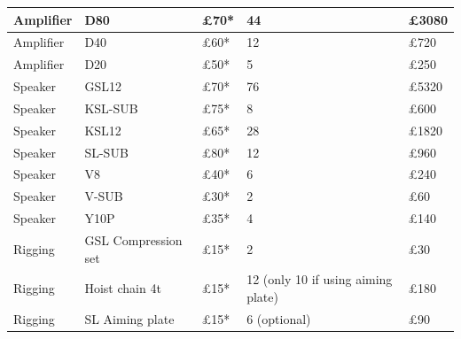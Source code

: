 \begin{longtable}[H]{|p{3cm}|p{4cm}|p{2cm}|p{3cm}|p{2cm}|}
Amplifier                          & D80                                & £70*                          & 44                                 & £3080  \\ \hline
Amplifier                          & D40                                & £60*                          & 12                                 & £720   \\ \hline
Amplifier                          & D20                                & £50*                          & 5                                  & £250   \\ \hline
\rowcolor[HTML]{EFEFEF} 
Speaker                            & GSL12                              & £70*                          & 76                                 & £5320  \\ \hline
\rowcolor[HTML]{EFEFEF} 
Speaker                            & KSL-SUB                            & £75*                          & 8                                  & £600   \\ \hline
\rowcolor[HTML]{EFEFEF} 
Speaker                            & KSL12                              & £65*                          & 28                                 & £1820  \\ \hline
\rowcolor[HTML]{EFEFEF} 
Speaker                            & SL-SUB                             & £80*                          & 12                                 & £960   \\ \hline
\rowcolor[HTML]{EFEFEF} 
Speaker                            & V8                                 & £40*                          & 6                                  & £240   \\ \hline
\rowcolor[HTML]{EFEFEF} 
Speaker                            & V-SUB                              & £30*                          & 2                                  & £60    \\ \hline
\rowcolor[HTML]{EFEFEF} 
Speaker                            & Y10P                               & £35*                          & 4                                  & £140   \\ \hline
Rigging                            & GSL Compression set                & £15*                          & 2                                  & £30    \\ \hline
Rigging                            & Hoist chain 4t                     & £15*                          & 12 (only 10 if using aiming plate) & £180   \\ \hline
Rigging                            & SL Aiming plate                    & £15*                          & 6 (optional)                       & £90    \\ \hline

\end{longtable}
